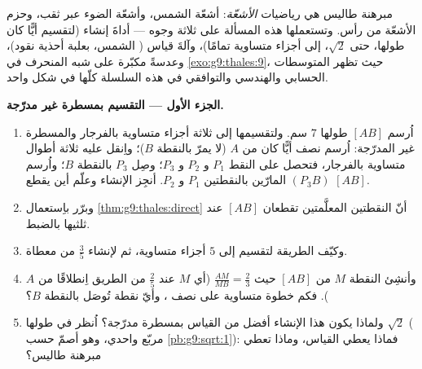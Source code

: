 \begin{problem}
\label{pb:g9:thales:1}
مبرهنة طاليس هي رياضيات \emph{الأشعّة}: أشعّة الشمس، وأشعّة الضوء
عبر ثقب، وحزم الأشعّة من رأس. وتستعملها هذه المسألة على ثلاثة
وجوه --- أداةَ إنشاء (لتقسيم  أيًّا كان طولها، حتى
$\sqrt2$، إلى أجزاء متساوية تمامًا)، وآلةَ قياس ( الشمس،
بعلبة أحذية  نقود)، وعدسةً مكبّرة على شبه المنحرف في
\cref{exo:g9:thales:9}، حيث تظهر المتوسطات الحسابي والهندسي
والتوافقي في هذه السلسلة كلّها في شكل واحد.

\medskip
\noindent\textbf{الجزء الأول --- التقسيم بمسطرة غير مدرّجة.}
\begin{enumerate}
  \item اُرسم  $[AB]$ طولها $7$ سم. ولتقسيمها إلى ثلاثة
        أجزاء متساوية بالفرجار والمسطرة غير المدرّجة: اُرسم نصف
         أيًّا كان من $A$ (لا يمرّ بالنقطة $B$)؛ واِنقل
        عليه ثلاثة أطوال متساوية بالفرجار، فتحصل على النقط
        $P_1$ و $P_2$ و $P_3$؛ وصِل $P_3$ بالنقطة $B$؛ واُرسم
          $(P_3 B)$ المارّين بالنقطتين $P_1$
        و $P_2$. أنجِز الإنشاء وعلّم أين يقطع 
         $[AB]$.
  \item وبرّر باِستعمال \cref{thm:g9:thales:direct} أنّ النقطتين
        المعلَّمتين تقطعان $[AB]$ عند ثلثيها بالضبط.
  \item وكيّف الطريقة لتقسيم  إلى $5$ أجزاء متساوية، ثم
        لإنشاء $\frac35$ من  معطاة.
  \item وأنشِئ النقطة $M$ من $[AB]$ حيث
        $\frac{AM}{MB} = \frac23$ (أي $M$ عند $\frac25$ من
        الطريق اِنطلاقًا من $A$). فكم خطوة متساوية على نصف
        ، وأيّ نقطة تُوصَل بالنقطة $B$؟
  \item ولماذا يكون هذا الإنشاء أفضل من القياس بمسطرة مدرّجة؟
        اُنظر في  طولها $\sqrt2$ ( مربّع واحدي، وهو أصمّ
        حسب \cref{pb:g9:sqrt:1}): فماذا يعطي القياس، وماذا
        تعطي مبرهنة طاليس؟
\end{enumerate}


\end{problem}
